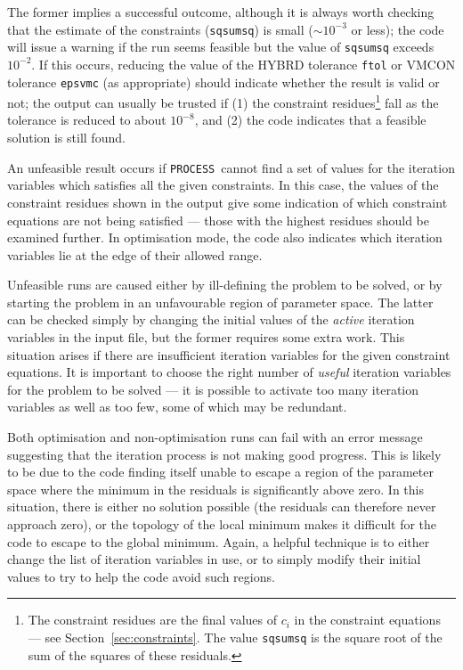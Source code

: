 \documentclass[11pt,a4paper]{report}
\newcommand{\process}{\mbox{\texttt{PROCESS}}}
\begin{document}
The former implies a successful outcome, although it is always worth checking
that the estimate of the constraints (\texttt{sqsumsq}) is small ($\sim
10^{-3}$ or less); the code will issue a warning if the run seems feasible but
the value of \texttt{sqsumsq} exceeds $10^{-2}$. If this occurs, reducing the
value of the HYBRD tolerance \texttt{ftol} or VMCON tolerance \texttt{epsvmc}
(as appropriate) should indicate whether the result is valid or not; the
output can usually be trusted if (1) the constraint residues\footnote{The
  constraint residues are the final values of $c_i$ in the constraint
  equations --- see Section~\ref{sec:constraints}. The value \texttt{sqsumsq}
  is the square root of the sum of the squares of these residuals.} fall as
the tolerance is reduced to about $10^{-8}$, and (2) the code indicates that a
feasible solution is still found.

An unfeasible result occurs if \process\ cannot find a set of values for the
iteration variables which satisfies all the given constraints. In this case,
the values of the constraint residues shown in the output give some indication
of which constraint equations are not being satisfied --- those with the
highest residues should be examined further. In optimisation mode, the code
also indicates which iteration variables lie at the edge of their allowed
range.

Unfeasible runs are caused either by ill-defining the problem to be solved, or
by starting the problem in an unfavourable region of parameter space. The
latter can be checked simply by changing the initial values of the
\textit{active}\/ iteration variables in the input file, but the former
requires some extra work. This situation arises if there are insufficient
iteration variables for the given constraint equations. It is important to
choose the right number of \textit{useful}\/ iteration variables for the
problem to be solved --- it is possible to activate too many iteration
variables as well as too few, some of which may be redundant.

Both optimisation and non-optimisation runs can fail with an error message
suggesting that the iteration process is not making good progress. This is
likely to be due to the code finding itself unable to escape a region of the
parameter space where the minimum in the residuals is significantly above
zero. In this situation, there is either no solution possible (the residuals
can therefore never approach zero), or the topology of the local minimum makes
it difficult for the code to escape to the global minimum. Again, a helpful
technique is to either change the list of iteration variables in use, or to
simply modify their initial values to try to help the code avoid such regions.
\end{document}
